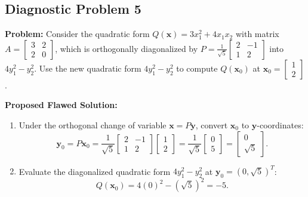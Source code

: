 \documentclass[11pt, letterpaper]{article}
\theoremstyle{definition}
\theoremstyle{remark}
\begin{document}
\hrulefill

\subsection*{Diagnostic Problem 5}
\textbf{Problem:} Consider the quadratic form $Q(\mathbf{x}) = 3x_1^2 + 4x_1x_2$ with matrix $A = \begin{bmatrix} 3 & 2 \\ 2 & 0 \end{bmatrix}$, which is orthogonally diagonalized by $P = \frac{1}{\sqrt{5}}\begin{bmatrix} 2 & -1 \\ 1 & 2 \end{bmatrix}$ into $4y_1^2 - y_2^2$. Use the new quadratic form $4y_1^2 - y_2^2$ to compute $Q(\mathbf{x}_0)$ at $\mathbf{x}_0 = \begin{bmatrix} 1 \\ 2 \end{bmatrix}$.

\textbf{Proposed Flawed Solution:}
\begin{enumerate}
    \item Under the orthogonal change of variable $\mathbf{x} = P\mathbf{y}$, convert $\mathbf{x}_0$ to $\mathbf{y}$-coordinates:
    \[
    \mathbf{y}_0 = P\mathbf{x}_0 = \frac{1}{\sqrt{5}}\begin{bmatrix} 2 & -1 \\ 1 & 2 \end{bmatrix}\begin{bmatrix} 1 \\ 2 \end{bmatrix} = \frac{1}{\sqrt{5}}\begin{bmatrix} 0 \\ 5 \end{bmatrix} = \begin{bmatrix} 0 \\ \sqrt{5} \end{bmatrix}.
    \]
    \item Evaluate the diagonalized quadratic form $4y_1^2 - y_2^2$ at $\mathbf{y}_0 = (0, \sqrt{5})^T$:
    \[
    Q(\mathbf{x}_0) = 4(0)^2 - (\sqrt{5})^2 = -5.
    \]
\end{enumerate}

\hrulefill
\end{document}
